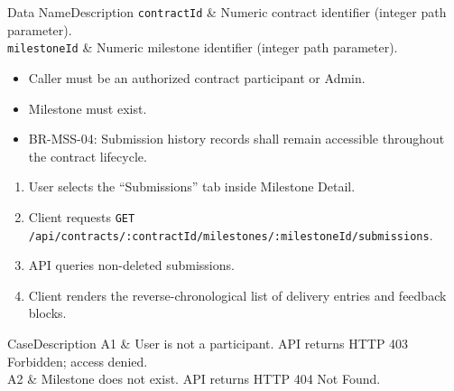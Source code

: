 
\begin{specdatatable}{Data Name}{Description}
      \texttt{contractId} & Numeric contract identifier (integer path parameter).\\ \hline
      \texttt{milestoneId} & Numeric milestone identifier (integer path parameter).\\ \hline
\end{specdatatable}

\begin{itemize}[leftmargin=1.6em,topsep=3pt,itemsep=2pt,parsep=0pt,label=$\bullet$]
      \item Caller must be an authorized contract participant or Admin.
      \item Milestone must exist.
\end{itemize}

\begin{itemize}[leftmargin=1.6em,topsep=3pt,itemsep=2pt,parsep=0pt,label=$\bullet$]\brrulelist
      \item BR-MSS-04: Submission history records shall remain accessible throughout the contract lifecycle.
\end{itemize}

\begin{enumerate}[leftmargin=1.8em,topsep=3pt,itemsep=2pt,parsep=0pt]
      \item User selects the ``Submissions'' tab inside Milestone Detail.
      \item Client requests \texttt{GET /\allowbreak{}api/\allowbreak{}contracts/\allowbreak{}:\allowbreak{}contractId/\allowbreak{}milestones/\allowbreak{}:\allowbreak{}milestoneId/\allowbreak{}submissions}.
      \item API queries non-deleted submissions.
      \item Client renders the reverse-chronological list of delivery entries and feedback blocks.
\end{enumerate}

\begin{flowtable}{Case}{Description}
      A1 & User is not a participant. API returns HTTP 403 Forbidden; access denied.\\ \hline
      A2 & Milestone does not exist. API returns HTTP 404 Not Found.\\ \hline
\end{flowtable}

